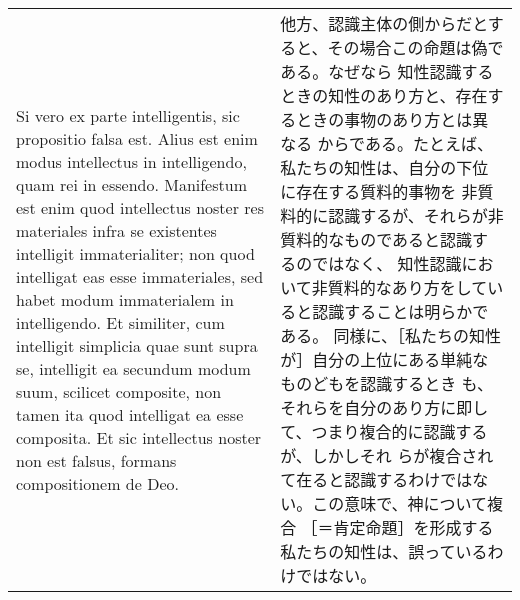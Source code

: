 \documentclass[paper=a4paper,fontsize=10pt,jafontsize=9pt,titlepage]{jlreq}
\begin{document}
\begin{longtable}{p{21em}p{21em}}
\\

Si vero ex parte intelligentis, sic propositio falsa est. Alius est
enim modus intellectus in intelligendo, quam rei in
essendo. Manifestum est enim quod intellectus noster res materiales
infra se existentes intelligit immaterialiter; non quod intelligat eas
esse immateriales, sed habet modum immaterialem in intelligendo. Et
similiter, cum intelligit simplicia quae sunt supra se, intelligit ea
secundum modum suum, scilicet composite, non tamen ita quod intelligat
ea esse composita. Et sic intellectus noster non est falsus, formans
compositionem de Deo.

&

他方、認識主体の側からだとすると、その場合この命題は偽である。なぜなら
知性認識するときの知性のあり方と、存在するときの事物のあり方とは異なる
からである。たとえば、私たちの知性は、自分の下位に存在する質料的事物を
非質料的に認識するが、それらが非質料的なものであると認識するのではなく、
知性認識において非質料的なあり方をしていると認識することは明らかである。
同様に、［私たちの知性が］自分の上位にある単純なものどもを認識するとき
も、それらを自分のあり方に即して、つまり複合的に認識するが、しかしそれ
らが複合されて在ると認識するわけではない。この意味で、神について複合
［＝肯定命題］を形成する私たちの知性は、誤っているわけではない。

\end{longtable}
\end{document}
